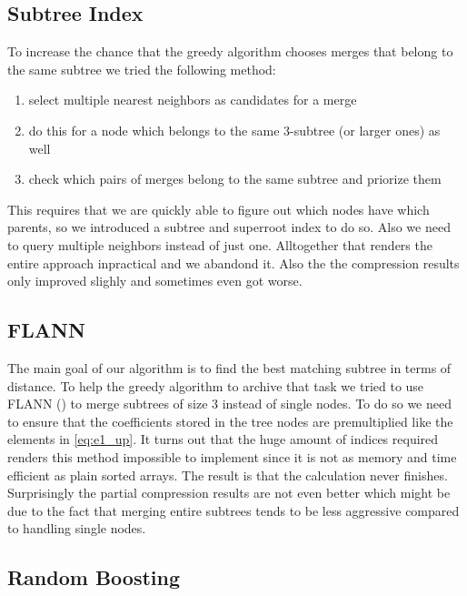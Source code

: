 \subsection{Subtree Index}
\label{ssec:algorithm:fail:stindex}

To increase the chance that the greedy algorithm chooses merges that belong to the same subtree we tried the following method:

\begin{enumerate}
    \item select multiple nearest neighbors as candidates for a merge
    \item do this for a node which belongs to the same \num{3}-subtree (or larger ones) as well
    \item check which pairs of merges belong to the same subtree and priorize them
\end{enumerate}

This requires that we are quickly able to figure out which nodes have which parents, so we introduced a subtree and superroot index to do so. Also we need to query multiple neighbors instead of just one. Alltogether that renders the entire approach inpractical and we abandond it. Also the the compression results only improved slighly and sometimes even got worse.


\subsection{FLANN}
\label{ssec:algorithm:fail:flann}

The main goal of our algorithm is to find the best matching subtree in terms of distance. To help the greedy algorithm to archive that task we tried to use FLANN (\cite{FLANN}) to merge subtrees of size \num{3} instead of single nodes. To do so we need to ensure that the coefficients stored in the tree nodes are premultiplied like the elements in \autoref{eq:e1_up}. It turns out that the huge amount of indices required renders this method impossible to implement since it is not as memory and time efficient as plain sorted arrays. The result is that the calculation never finishes. Surprisingly the partial compression results are not even better which might be due to the fact that merging entire subtrees tends to be less aggressive compared to handling single nodes.


\subsection{Random Boosting}
\label{ssec:algorithm:fail:random}


